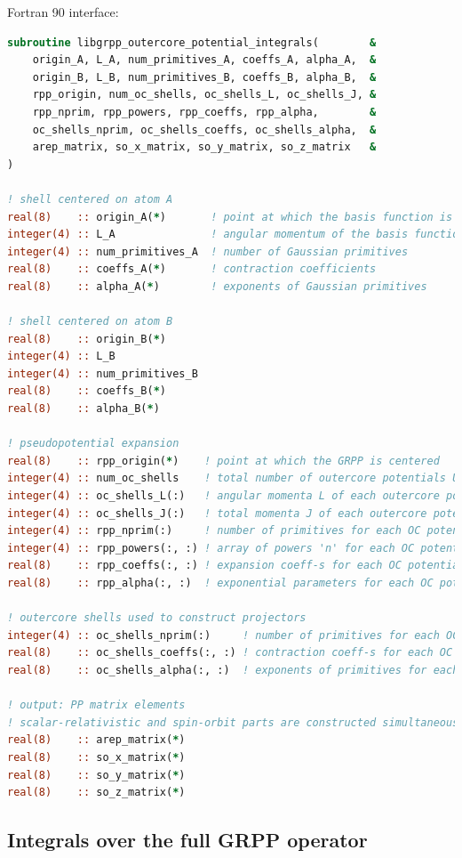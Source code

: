 \documentclass[12pt]{article}
\begin{document}
Fortran 90 interface:
\begin{lstlisting}[language=Fortran]
subroutine libgrpp_outercore_potential_integrals(        &
    origin_A, L_A, num_primitives_A, coeffs_A, alpha_A,  &
    origin_B, L_B, num_primitives_B, coeffs_B, alpha_B,  &
    rpp_origin, num_oc_shells, oc_shells_L, oc_shells_J, &
    rpp_nprim, rpp_powers, rpp_coeffs, rpp_alpha,        &
    oc_shells_nprim, oc_shells_coeffs, oc_shells_alpha,  &
    arep_matrix, so_x_matrix, so_y_matrix, so_z_matrix   &
)

! shell centered on atom A
real(8)    :: origin_A(*)       ! point at which the basis function is centered
integer(4) :: L_A               ! angular momentum of the basis function
integer(4) :: num_primitives_A  ! number of Gaussian primitives
real(8)    :: coeffs_A(*)       ! contraction coefficients
real(8)    :: alpha_A(*)        ! exponents of Gaussian primitives

! shell centered on atom B
real(8)    :: origin_B(*)
integer(4) :: L_B
integer(4) :: num_primitives_B
real(8)    :: coeffs_B(*)
real(8)    :: alpha_B(*)

! pseudopotential expansion
real(8)    :: rpp_origin(*)    ! point at which the GRPP is centered
integer(4) :: num_oc_shells    ! total number of outercore potentials U_{n_c,lj}
integer(4) :: oc_shells_L(:)   ! angular momenta L of each outercore potential
integer(4) :: oc_shells_J(:)   ! total momenta J of each outercore potential
integer(4) :: rpp_nprim(:)     ! number of primitives for each OC potential
integer(4) :: rpp_powers(:, :) ! array of powers 'n' for each OC potential
real(8)    :: rpp_coeffs(:, :) ! expansion coeff-s for each OC potential
real(8)    :: rpp_alpha(:, :)  ! exponential parameters for each OC potential

! outercore shells used to construct projectors
integer(4) :: oc_shells_nprim(:)     ! number of primitives for each OC shell
real(8)    :: oc_shells_coeffs(:, :) ! contraction coeff-s for each OC shell
real(8)    :: oc_shells_alpha(:, :)  ! exponents of primitives for each OC shell

! output: PP matrix elements
! scalar-relativistic and spin-orbit parts are constructed simultaneously
real(8)    :: arep_matrix(*)
real(8)    :: so_x_matrix(*)
real(8)    :: so_y_matrix(*)
real(8)    :: so_z_matrix(*)
\end{lstlisting}


\subsection{Integrals over the full GRPP operator}
\end{document}
